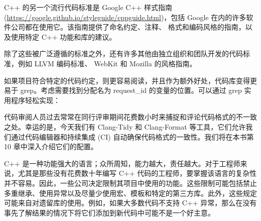 C++ 的另一个流行代码标准是 Google C++ 样式指南 (\url{https://google.github.io/styleguide/cppguide.html})，包括 Google 在内的许多软件公司都在使用它。该指南提供了命名约定、注释、 格式和编码风格的指南，以及使用特定 C++ 功能和库的建议。

除了这些被广泛遵循的标准之外，还有许多其他由独立组织和团队开发的代码标准，例如 LLVM 编码标准、 WebKit 和 Mozilla 的风格指南。

如果项目符合特定的代码约定，则更容易阅读，并且作为额外好处，代码库变得更易于 grep。考虑需要找到分配名为 request\_id 的变量的位置。可以通过 grep 实用程序轻松实现：


代码审阅人员过去常常在同行评审期间花费数小时来捕捉和评论代码格式的不一致之处。幸运的是，今天我们有 Clang-Tidy 和 Clang-Format 等工具，它们允许我们通过代码编辑器和持续集成 (CI) 自动确保代码格式的一致性。我们将在本书第 10 章中深入介绍它们的配置。


C++ 是一种功能强大的语言；众所周知，能力越大，责任越大。对于工程师来说，尤其是那些没有花费数十年编写 C++ 代码的工程师，要掌握该语言的复杂性并不容易。因此，一些公司决定限制其项目中使用的功能。这些限制可能包括禁止多重继承、使用异常以及尽量少使用宏、模板和特定的第三方库。此外，这些规定可能来自对遗留库的使用。例如，如果大多数代码不支持 C++ 异常，那么在没有事先了解结果的情况下将它们添加到新代码中可能不是一个好主意。
